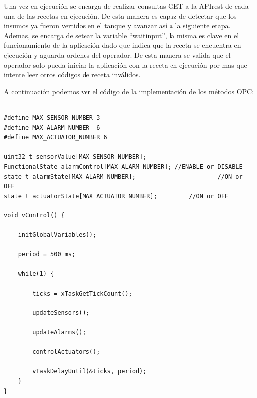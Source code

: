 Una vez en ejecución se encarga de realizar consultas GET a la APIrest de cada una de las recetas en ejecución. De esta manera es capaz de detectar que los insumos ya fueron vertidos en el tanque y avanzar así a la siguiente etapa. Ademas, se encarga de setear la variable ``waitinput'', la misma es clave en el funcionamiento de la aplicación dado que indica que la receta se encuentra en ejecución y aguarda ordenes del operador. De esta manera se valida que el operador solo pueda iniciar la aplicación con la receta en ejecución por mas que intente leer otros códigos de receta inválidos. 

A continuación podemos ver el código de la implementación de los métodos OPC:

\begin{lstlisting}[label=cod:vControl,caption=Pseudocódigo del lazo principal de control.]  % Start your code-block

#define MAX_SENSOR_NUMBER 3
#define MAX_ALARM_NUMBER  6
#define MAX_ACTUATOR_NUMBER 6

uint32_t sensorValue[MAX_SENSOR_NUMBER];		
FunctionalState alarmControl[MAX_ALARM_NUMBER];	//ENABLE or DISABLE
state_t alarmState[MAX_ALARM_NUMBER];						//ON or OFF
state_t actuatorState[MAX_ACTUATOR_NUMBER];			//ON or OFF

void vControl() {

	initGlobalVariables();
	
	period = 500 ms;
		
	while(1) {

		ticks = xTaskGetTickCount();
		
		updateSensors();
		
		updateAlarms();
		
		controlActuators();
		
		vTaskDelayUntil(&ticks, period);
	}
}

\end{lstlisting}



